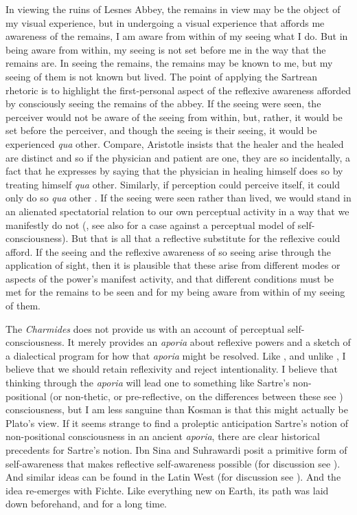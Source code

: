 In viewing the ruins of Lesnes Abbey, the remains in view may be the object of my visual experience, but in undergoing a visual experience that affords me awareness of the remains, I am aware from within of my seeing what I do. But in being aware from within, my seeing is not set before me in the way that the remains are. In seeing the remains, the remains may be known to me, but my seeing of them is not known but lived. The point of applying the Sartrean rhetoric is to highlight the first-personal aspect of the reflexive awareness afforded by consciously seeing the remains of the abbey. If the seeing were seen, the perceiver would not be aware of the seeing from within, but, rather, it would be set before the perceiver, and though the seeing is their seeing, it would be experienced \emph{qua} other. Compare, Aristotle insists that the healer and the healed are distinct and so if the physician and patient are one, they are so incidentally, a fact that he expresses by saying that the physician in healing himself does so by treating himself \emph{qua} other. Similarly, if perception could perceive itself, it could only do so \emph{qua} other \citep[8]{Rodl:2007aa}. If the seeing were seen rather than lived, we would stand in an alienated spectatorial relation to our own perceptual activity in a way that we manifestly do not (\citealt{Moran:2001aa}, see also \citealt{shoemaker96} for a case against a perceptual model of self-consciousness). But that is all that a reflective substitute for the reflexive could afford. If the seeing and the reflexive awareness of so seeing arise through the application of sight, then it is plausible that these arise from different modes or aspects of the power's manifest activity, and that different conditions must be met for the remains to be seen and for my being aware from within of my seeing of them.

The \emph{Charmides} does not provide us with an account of perceptual self-conscious\-ness. It merely provides an \emph{aporia} about reflexive powers and a sketch of a dialectical program for how that \emph{aporia} might be resolved. Like \citet{Kosman:2014aa}, and unlike \citet{McCabe:2007ss}, I believe that we should retain reflexivity and reject intentionality. I believe that thinking through the \emph{aporia} will lead one to something like Sartre's non-positional (or non-thetic, or pre-reflective, on the differences between these see \citealt{Webber:2002aa}) consciousness, but I am less sanguine than Kosman is that this might actually be Plato's view. If it seems strange to find a proleptic anticipation Sartre's notion of non-positional consciousness in an ancient \emph{aporia}, there are clear historical precedents for Sartre's notion. Ibn Sina and Suhrawardi posit a primitive form of self-awareness that makes reflective self-awareness possible (for discussion see \citealt{Kaukua:2014si}). And similar ideas can be found in the Latin West (for discussion see \citealt{Cory:2013oh}). And the idea re-emerges with Fichte. Like everything new on Earth, its path was laid down beforehand, and for a long time.

